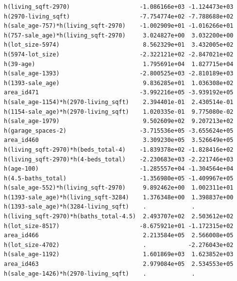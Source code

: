\documentclass[
]{article}
\begin{document}
\begin{verbatim}
h(living_sqft-2970)                    -1.086166e+03 -1.124473e+03
h(2970-living_sqft)                    -7.754774e+02 -7.788688e+02
h(sale_age-757)*h(living_sqft-2970)    -1.002909e+01 -1.016266e+01
h(757-sale_age)*h(living_sqft-2970)     3.024827e+00  3.032200e+00
h(lot_size-5974)                        8.562329e+01  3.432005e+02
h(5974-lot_size)                       -2.322121e+02 -2.847021e+02
h(39-age)                               1.795691e+04  1.827715e+04
h(sale_age-1393)                       -2.800525e+03 -2.810189e+03
h(1393-sale_age)                        9.836285e+01  1.036308e+02
area_id471                             -3.992216e+05 -3.939192e+05
h(sale_age-1154)*h(2970-living_sqft)    2.394401e-01  2.430514e-01
h(1154-sale_age)*h(2970-living_sqft)    1.020335e-01  9.775080e-02
h(sale_age-1979)                        9.502609e+02  9.207213e+02
h(garage_spaces-2)                     -3.715536e+05 -3.655624e+05
area_id460                              3.309230e+05  3.526649e+05
h(living_sqft-2970)*h(beds_total-4)    -1.839378e+02 -1.828416e+02
h(living_sqft-2970)*h(4-beds_total)    -2.230683e+03 -2.221746e+03
h(age-100)                             -1.285557e+04 -1.304564e+04
h(4.5-baths_total)                     -1.356980e+05 -1.409967e+05
h(sale_age-552)*h(living_sqft-2970)     9.892462e+00  1.002311e+01
h(1393-sale_age)*h(living_sqft-3284)    1.376348e+00  1.398837e+00
h(1393-sale_age)*h(3284-living_sqft)    .             .           
h(living_sqft-2970)*h(baths_total-4.5)  2.493707e+02  2.503612e+02
h(lot_size-8517)                       -8.675921e+01 -1.172315e+02
area_id466                              2.213584e+05  2.566008e+05
h(lot_size-4702)                        .            -2.276043e+02
h(sale_age-1192)                        1.601869e+03  1.623852e+03
area_id463                              2.979084e+05  2.534553e+05
h(sale_age-1426)*h(2970-living_sqft)    .             .           
                                                                  

\end{verbatim}
\end{document}
